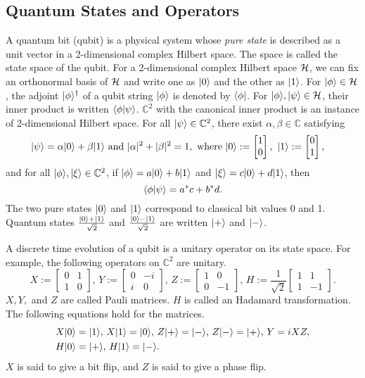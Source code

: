 \subsection*{Quantum States and Operators}
A quantum bit (qubit) is a physical system
whose {\it pure state} is described as a unit vector in
a 2-dimensional complex Hilbert space. The space is called
the state space of the qubit.
For a 2-dimensional complex Hilbert space $\mathcal{H}$,
we can fix an orthonormal basis of $\mathcal{H}$ and write one as
$|0\rangle$ and the other as $|1\rangle$. 
For $|\phi\rangle \in \mathcal{H}$,
the adjoint $|\phi\rangle^\dagger$ of a qubit string $|\phi\rangle$ is denoted
by $\langle \phi|$.
For $|\phi\rangle,|\psi\rangle \in \mathcal{H}$,
their inner product is written $\langle \phi|\psi\rangle$.
$\mathbb{C}^2$ with the
canonical inner product is an instance of 2-dimensional Hilbert space.
For all $|\psi\rangle \in \mathbb{C}^2$,
there exist $\alpha, \beta \in \mathbb{C}$ satisfying
\begin{align*}
&|\psi\rangle = \alpha |0\rangle + \beta |1\rangle \mbox{ and }|\alpha|^2 + |\beta|^2 = 1,
\mbox{ where }|0\rangle 
:= \begin{bmatrix}
    1\\
    0
  \end{bmatrix},
~|1\rangle
:= \begin{bmatrix}
  0 \\
  1
  \end{bmatrix},
\end{align*}
and for all $|\phi\rangle, |\xi\rangle \in \mathbb{C}^2$, if
$|\phi\rangle = a|0\rangle + b|1\rangle$ and $|\xi\rangle = c|0\rangle +
d|1\rangle$, then 
\[
\langle \phi|\psi\rangle = a^\ast c + b^\ast d.
\]
The two pure states $|0\rangle$ and $|1\rangle$ correspond to classical bit
values 0 and 1. Quantum states $\frac{|0\rangle+|1\rangle}{\sqrt{2}}$ and
$\frac{|0\rangle-|1\rangle}{\sqrt{2}}$ are written $|+\rangle$ and $|-\rangle$.

A discrete time evolution of a qubit is a unitary operator on its state
space. For example, the following operators on $\mathbb{C}^2$ are
unitary.
\[
 X := \begin{bmatrix}
  0 & 1\\
  1 & 0
  \end{bmatrix},\,
 Y := \begin{bmatrix}
  0 & -i\\
  i & 0
  \end{bmatrix},\,
 Z := \begin{bmatrix}
  1 & 0\\
  0 & -1
  \end{bmatrix},\,
 H := \frac{1}{\sqrt{2}}
 \begin{bmatrix}
  1 & 1\\
  1 & -1
 \end{bmatrix}.
\]
$X, Y,$ and $Z$ are called Pauli matrices. $H$ is called
an Hadamard transformation. The following equations hold for the matrices.
\begin{align*}
 &X|0\rangle = |1\rangle,\, X|1\rangle = |0\rangle,\, Z|+\rangle = |-\rangle,\,
 Z|-\rangle = |+\rangle,\, Y = iXZ,\\
 &H|0\rangle = |+\rangle,\,H|1\rangle = |-\rangle.
\end{align*}
$X$ is said to give a bit flip, and
$Z$ is said to give a phase flip.

